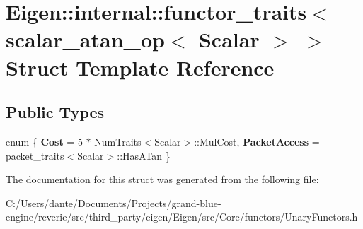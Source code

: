 \hypertarget{struct_eigen_1_1internal_1_1functor__traits_3_01scalar__atan__op_3_01_scalar_01_4_01_4}{}\section{Eigen\+::internal\+::functor\+\_\+traits$<$ scalar\+\_\+atan\+\_\+op$<$ Scalar $>$ $>$ Struct Template Reference}
\label{struct_eigen_1_1internal_1_1functor__traits_3_01scalar__atan__op_3_01_scalar_01_4_01_4}
\subsection*{Public Types}
\begin{DoxyCompactItemize}
\item 
\mbox{\label{struct_eigen_1_1internal_1_1functor__traits_3_01scalar__atan__op_3_01_scalar_01_4_01_4_aa84c2591cb7c939964b7579f89586f79}} 
enum \{ {\bfseries Cost} = 5 $\ast$ Num\+Traits$<$Scalar$>$\+::Mul\+Cost, 
{\bfseries Packet\+Access} = packet\+\_\+traits$<$Scalar$>$\+::Has\+A\+Tan
 \}
\end{DoxyCompactItemize}


The documentation for this struct was generated from the following file\+:\begin{DoxyCompactItemize}
\item 
C\+:/\+Users/dante/\+Documents/\+Projects/grand-\/blue-\/engine/reverie/src/third\+\_\+party/eigen/\+Eigen/src/\+Core/functors/Unary\+Functors.\+h\end{DoxyCompactItemize}
